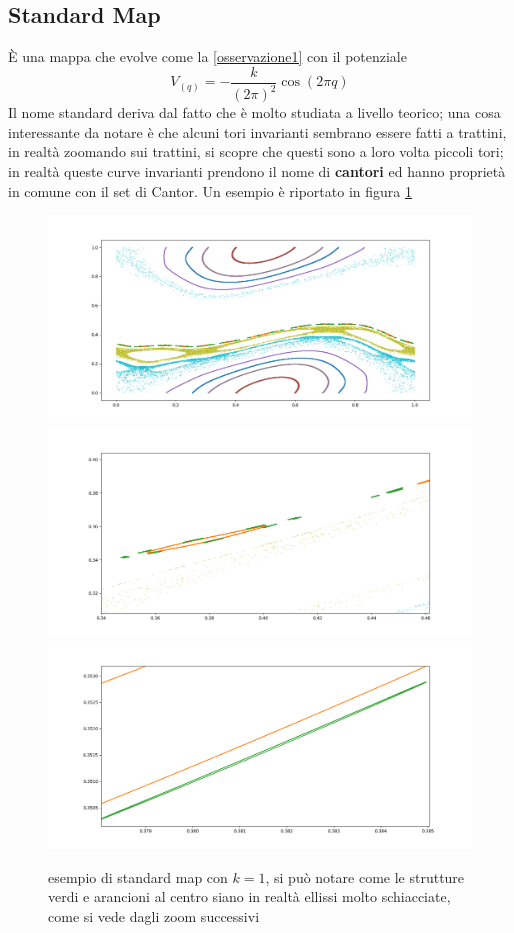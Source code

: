 \documentclass[a4paper,12pt]{article}
\renewcommand{\arg}[1]{_{(#1)}}
\theoremstyle{plain}
\theoremstyle{definition}
\newcommand{\f}[2]{\frac{#1}{#2}}
\theoremstyle{remark}
\begin{document}
\subsection{Standard Map}
È una mappa che evolve come la \ref{osservazione1} con il potenziale \[V\arg{q}=-\f{k}{(2\pi)^2}\cos(2\pi q)\]
Il nome standard deriva dal fatto che è molto studiata a livello teorico; una cosa interessante da notare è che alcuni tori invarianti sembrano essere fatti a trattini, in realtà zoomando sui trattini, si scopre che questi sono a loro volta piccoli tori; in realtà queste curve invarianti prendono il nome di \textbf{cantori} ed hanno proprietà in comune con il set di Cantor. Un esempio è riportato in figura \ref{cantor}
\begin{figure}[h]
	\centering
	\includegraphics[scale=0.5]{util1}
	\includegraphics[scale=0.2]{util2}
	\includegraphics[scale=0.2]{util3}
	\caption{esempio di standard map con $k=1$, si può notare come le strutture verdi e arancioni al centro siano in realtà ellissi molto schiacciate, come si vede dagli zoom successivi}
	\label{cantor}
\end{figure}
\end{document}
